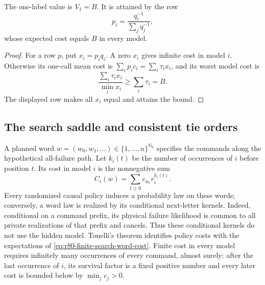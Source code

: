 \begin{lemma}
\label{lem:r80-finite-search-one-label}
The one-label value is $V_1=B$.  It is attained by the row
\begin{equation}\label{eq:r80-finite-search-fallback}
 p_i=\frac{q_i^{-1}}{\sum_jq_j^{-1}},
\end{equation}
whose expected cost equals $B$ in every model.
\end{lemma}
\begin{proof}
For a row $p$, put $x_i=p_iq_i$.  A zero $x_i$ gives infinite cost
in model $i$.  Otherwise its one-call mean cost is
$\sum_i p_ic_i=\sum_i\tau_i x_i$, and its worst model cost is
\[
 \frac{\sum_i\tau_i x_i}{\min_i x_i}\ge\sum_i\tau_i=B.
\]
The displayed row makes all $x_i$ equal and attains the bound.
\end{proof}

\subsection{The search saddle and consistent tie orders}

A planned word $w=(w_0,w_1,\ldots)\in\{1,\ldots,n\}^{\mathbb N_0}$
specifies the commands along the hypothetical all-failure path.
Let $k_i(t)$ be the number of occurrences of $i$ before position $t$.
Its cost in model $i$ is the nonnegative sum
\begin{equation}\label{eq:r80-finite-search-word-cost}
 C_i(w)=\sum_{t\ge0}c_{w_t}r_i^{k_i(t)}.
\end{equation}
Every randomized causal policy induces a probability law on these
words; conversely, a word law is realized by its conditional
next-letter kernels.  Indeed, conditional on a command prefix, its
physical failure likelihood is common to all private realizations of
that prefix and cancels.  Thus these conditional kernels do not use
the hidden model.  Tonelli's theorem identifies policy costs with the
expectations of \eqref{eq:r80-finite-search-word-cost}.  Finite cost
in every model requires infinitely many occurrences of every command,
almost surely: after the last occurrence of $i$, its survival factor
is a fixed positive number and every later cost is bounded below by
$\min_jc_j>0$.

